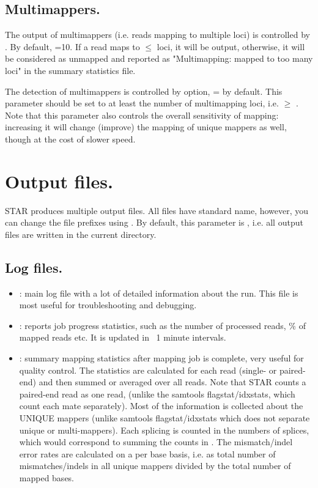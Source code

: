 \documentclass[12pt]{article}
\begin{document}
\subsection{Multimappers.}
The output of multimappers (i.e. reads mapping to multiple loci) is controlled by 
 . By default, =10. If a read maps to $\le$ loci, it will be output, otherwise, it will be considered as unmapped and reported as "Multimapping: mapped to too many loci" in the  summary statistics file.

The detection of multimappers is controlled by  option, = by default. This parameter should be set to at least the number of multimapping loci, i.e.  $\ge$ . Note that this parameter also controls the overall sensitivity of mapping: increasing it will change (improve) the mapping of unique mappers as well, though at the cost of slower speed.
	
\section{Output files.}\label{Output_files}
STAR produces multiple output files. All files have standard name, however, you can change the file prefixes using  . By default, this parameter is , i.e. all output files are written in the current directory.
\subsection{Log files.}
\begin{itemize}
\item[]
: main log file with a lot of detailed information about the run. This file is most useful for troubleshooting and debugging.
\item[]
: reports job progress statistics, such as the number of processed reads, \% of mapped reads etc. It is updated in ~1 minute intervals.
\item[]
: summary mapping statistics after mapping job is complete, very useful for quality control. The statistics are calculated for each read (single- or paired-end) and then summed or averaged over all reads. Note that STAR counts a paired-end read as one read, (unlike the samtools flagstat/idxstats, which count each mate separately). Most of the information is collected about the UNIQUE mappers (unlike samtools flagstat/idxstats which does not separate unique or multi-mappers). Each splicing is counted in the numbers of splices, which would correspond to summing the counts in . The mismatch/indel error rates are calculated on a per base basis, i.e. as total number of mismatches/indels in all unique mappers divided by the total number of mapped bases.
\end{itemize}
\end{document}
